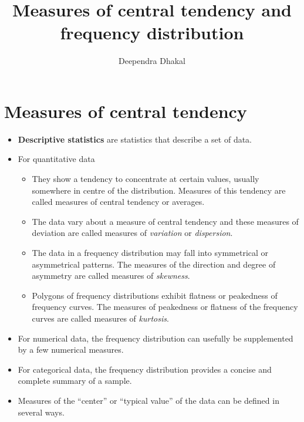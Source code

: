 \documentclass[
  ignorenonframetext,
  aspectratio=169]{beamer}
\title{Measures of central tendency and frequency distribution}
\author{Deependra Dhakal}
\date{}
\institute{Assistant Professor \and Agriculture and Forestry
University \and \url{https://rookie.rbind.io}}
\providecommand{\tightlist}{%
  \setlength{\itemsep}{0pt}\setlength{\parskip}{0pt}}
\begin{document}
\frame{\titlepage}

\begin{frame}[allowframebreaks]
  \tableofcontents[hideallsubsections]
\end{frame}
\hypertarget{measures-of-central-tendency}{%
\section{Measures of central
tendency}\label{measures-of-central-tendency}}

\begin{frame}{}
\protect\hypertarget{section}{}
\small

\begin{itemize}
\tightlist
\item
  \textbf{Descriptive statistics} are statistics that describe a set of
  data.
\item
  For quantitative data

  \begin{itemize}
  \tightlist
  \item
    They show a tendency to concentrate at certain values, usually
    somewhere in centre of the distribution. Measures of this tendency
    are called measures of central tendency or averages.
  \item
    The data vary about a measure of central tendency and these measures
    of deviation are called measures of \emph{variation} or
    \emph{dispersion}.
  \item
    The data in a frequency distribution may fall into symmetrical or
    asymmetrical patterns. The measures of the direction and degree of
    asymmetry are called measures of \emph{skewness}.
  \item
    Polygons of frequency distributions exhibit flatness or peakedness
    of frequency curves. The measures of peakedness or flatness of the
    frequency curves are called measures of \emph{kurtosis}.
  \end{itemize}
\item
  For numerical data, the frequency distribution can usefully be
  supplemented by a few numerical measures.
\item
  For categorical data, the frequency distribution provides a concise
  and complete summary of a sample.
\item
  Measures of the ``center'' or ``typical value'' of the data can be
  defined in several ways.
\end{itemize}
\end{frame}
\end{document}

